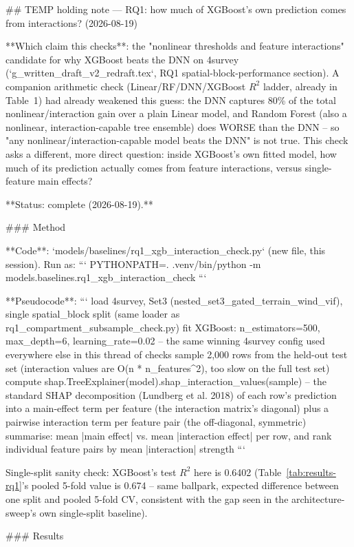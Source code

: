 ## TEMP holding note — RQ1: how much of XGBoost's own prediction comes from interactions? (2026-08-19)

**Which claim this checks**: the "nonlinear thresholds and feature interactions" candidate for why
XGBoost beats the DNN on 4survey (`g_written_draft_v2_redraft.tex`, RQ1 spatial-block-performance
section). A companion arithmetic check (Linear/RF/DNN/XGBoost $R^2$ ladder, already in Table~1) had
already weakened this guess: the DNN captures 80\% of the total nonlinear/interaction gain over a
plain Linear model, and Random Forest (also a nonlinear, interaction-capable tree ensemble) does
WORSE than the DNN -- so "any nonlinear/interaction-capable model beats the DNN" is not true. This
check asks a different, more direct question: inside XGBoost's own fitted model, how much of its
prediction actually comes from feature interactions, versus single-feature main effects?

**Status: complete (2026-08-19).**

### Method

**Code**: `models/baselines/rq1_xgb_interaction_check.py` (new file, this session). Run as:
```
PYTHONPATH=. .venv/bin/python -m models.baselines.rq1_xgb_interaction_check
```

**Pseudocode**:
```
load 4survey, Set3 (nested_set3_gated_terrain_wind_vif), single spatial_block split (same loader
    as rq1_compartment_subsample_check.py)
fit XGBoost: n_estimators=500, max_depth=6, learning_rate=0.02 -- the same winning 4survey config
    used everywhere else in this thread of checks
sample 2,000 rows from the held-out test set (interaction values are O(n * n_features^2), too
    slow on the full test set)
compute shap.TreeExplainer(model).shap_interaction_values(sample) -- the standard SHAP
    decomposition (Lundberg et al. 2018) of each row's prediction into a main-effect term per
    feature (the interaction matrix's diagonal) plus a pairwise interaction term per feature pair
    (the off-diagonal, symmetric)
summarise: mean |main effect| vs. mean |interaction effect| per row, and rank individual feature
    pairs by mean |interaction| strength
```

Single-split sanity check: XGBoost's test $R^2$ here is 0.6402 (Table~\ref{tab:results-rq1}'s
pooled 5-fold value is 0.674 -- same ballpark, expected difference between one split and pooled
5-fold CV, consistent with the gap seen in the architecture-sweep's own single-split baseline).

### Results

